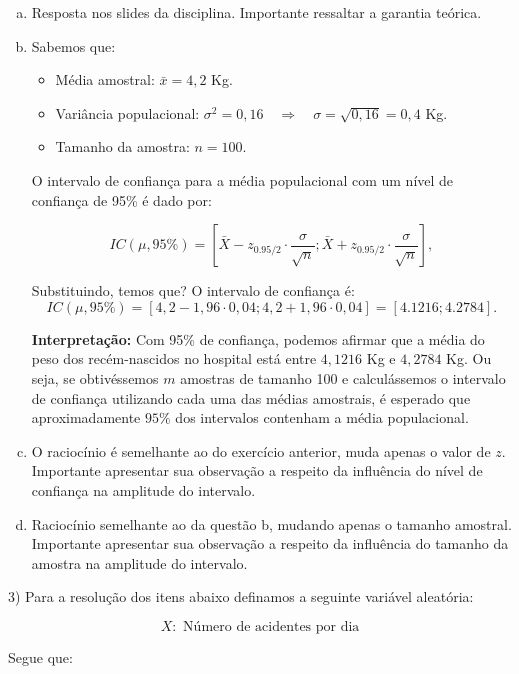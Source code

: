 \documentclass{article}
\begin{document}
\begin{enumerate}[a)]
    \item Resposta nos slides da disciplina. Importante ressaltar a garantia teórica.  
    \item Sabemos que:
    \begin{itemize}
        \item Média amostral: $\bar{x} = 4,2$ Kg.
        \item Variância populacional: $\sigma^2 = 0,16 \quad \Rightarrow \quad \sigma = \sqrt{0,16} = 0,4$ Kg.
        \item Tamanho da amostra: $n = 100$.
    \end{itemize}
    O intervalo de confiança para a média populacional com um nível de confiança de 95\% é dado por:
    
    $$IC(\mu, 95\%) = \left[\bar{X} - z_{0.95/2} \cdot \frac{\sigma}{\sqrt{n}} ; \bar{X} + z_{0.95/2} \cdot \frac{\sigma}{\sqrt{n}}\right],$$
    
    Substituindo, temos que? O intervalo de confiança é:
    \[
    IC(\mu, 95\%) = [4,2 - 1,96 \cdot 0,04; 4,2 + 1,96 \cdot 0,04]  = [4.1216; 4.2784].
    \]
    
    \textbf{Interpretação:} Com 95\% de confiança, podemos afirmar que a média do peso dos recém-nascidos no hospital está entre $4,1216$ Kg e $4,2784$ Kg. Ou seja, se obtivéssemos $m$ amostras de tamanho 100 e calculássemos o intervalo de confiança utilizando cada uma das médias amostrais, é esperado que aproximadamente $95\%$ dos intervalos contenham a média populacional. 
    
    \item O raciocínio é semelhante ao do exercício anterior, muda apenas o valor de $z$. Importante apresentar sua observação a respeito da influência do nível de confiança na amplitude do intervalo. 
    \item Raciocínio semelhante ao da questão b, mudando apenas o tamanho amostral. Importante apresentar sua observação a respeito da influência do tamanho da amostra na amplitude do intervalo. 
\end{enumerate}


3)
Para a resolução dos itens abaixo definamos a seguinte variável aleatória:

$$X: \text{ Número de acidentes por dia} $$

Segue que:
\end{document}
